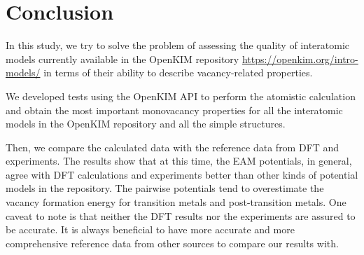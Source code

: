 \documentclass[%
 reprint,
 amsmath,amssymb,
 aps,
]{revtex4-1}
\begin{document}
%
%
%


\section{\label{sec:conclusion}Conclusion}

In this study, we try to solve the problem of assessing the quality of interatomic models currently available in the OpenKIM repository \url{https://openkim.org/intro-models/} in terms of their ability to describe vacancy-related properties.

We developed tests using the OpenKIM API to perform the atomistic calculation and obtain the most important monovacancy properties for all the interatomic models in the OpenKIM repository and all the simple structures.

Then, we compare the calculated data with the reference data from DFT and experiments.
The results show that at this time, the EAM potentials, in general, agree with DFT calculations and experiments better than other kinds of potential models in the repository.
The pairwise potentials tend to overestimate the vacancy formation energy for transition metals and post-transition metals.
One caveat to note is that neither the DFT results nor the experiments are assured to be accurate.
It is always beneficial to have more accurate and more comprehensive reference data from other sources to compare our results with.
\end{document}
